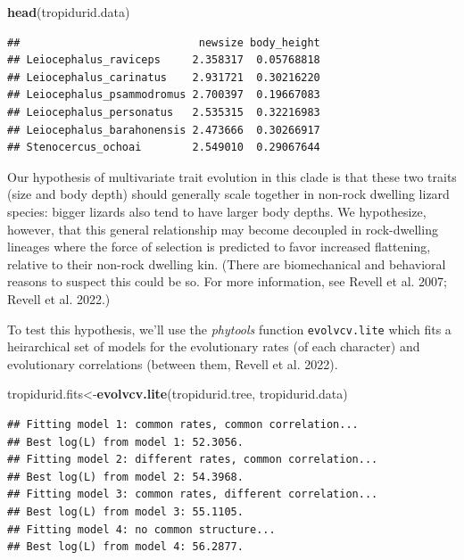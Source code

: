 \documentclass[fleqn,10pt,lineno]{wlpeerj} %
\newenvironment{Shaded}{\begin{snugshade}}{\end{snugshade}}
\newcommand{\FunctionTok}[1]{\textcolor[rgb]{0.13,0.29,0.53}{\textbf{#1}}}
\newcommand{\NormalTok}[1]{#1}
\newcommand{\OtherTok}[1]{\textcolor[rgb]{0.56,0.35,0.01}{#1}}
\begin{document}
\begin{Shaded}
\begin{Highlighting}[]
\FunctionTok{head}\NormalTok{(tropidurid.data)}
\end{Highlighting}
\end{Shaded}

\begin{verbatim}
##                            newsize body_height
## Leiocephalus_raviceps     2.358317  0.05768818
## Leiocephalus_carinatus    2.931721  0.30216220
## Leiocephalus_psammodromus 2.700397  0.19667083
## Leiocephalus_personatus   2.535315  0.32216983
## Leiocephalus_barahonensis 2.473666  0.30266917
## Stenocercus_ochoai        2.549010  0.29067644
\end{verbatim}

Our hypothesis of multivariate trait evolution in this clade is that these two traits (size and body depth) should generally scale together in non-rock dwelling lizard species: bigger lizards also tend to have larger body depths. We hypothesize, however, that this general relationship may become decoupled in rock-dwelling lineages where the force of selection is predicted to favor increased flattening, relative to their non-rock dwelling kin. (There are biomechanical and behavioral reasons to suspect this could be so. For more information, see Revell et al. 2007; Revell et al. 2022.)

To test this hypothesis, we'll use the \emph{phytools} function \texttt{evolvcv.lite} which fits a heirarchical set of models for the evolutionary rates (of each character) and evolutionary correlations (between them, Revell et al. 2022).

\begin{Shaded}
\begin{Highlighting}[]
\NormalTok{tropidurid.fits}\OtherTok{\textless{}{-}}\FunctionTok{evolvcv.lite}\NormalTok{(tropidurid.tree,}
\NormalTok{  tropidurid.data)}
\end{Highlighting}
\end{Shaded}

\begin{verbatim}
## Fitting model 1: common rates, common correlation...
## Best log(L) from model 1: 52.3056.
## Fitting model 2: different rates, common correlation...
## Best log(L) from model 2: 54.3968.
## Fitting model 3: common rates, different correlation...
## Best log(L) from model 3: 55.1105.
## Fitting model 4: no common structure...
## Best log(L) from model 4: 56.2877.
\end{verbatim}
\end{document}
